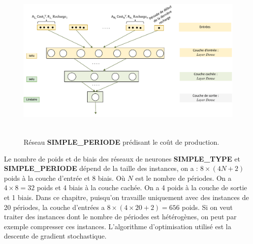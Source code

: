\begin{figure}[H]
	\centerline{
		\includegraphics[height=8cm]{images_these/SFC2.pdf}}
	\caption[Réseau SIMPLE\_PERIODE]{Réseau \textbf{SIMPLE\_PERIODE} prédisant le coût de production.}
	\label{SFC2}
\end{figure}

Le nombre de poids et de biais des réseaux de neurones \textbf{SIMPLE\_TYPE} et \textbf{SIMPLE\_PERIODE} dépend de la taille des instances, on a : $8 \times (4N+2)$ poids à la couche d'entrée et 8 biais. Où $N$ est le nombre de périodes. On a $4 \times 8 =32$ poids et 4 biais à la couche cachée. On a 4 poids à la couche de sortie et 1 biais. Dans ce chapitre, puisqu'on travaille uniquement avec des instances de 20 périodes, la couche d'entrées a $8\times(4\times 20 +2)=656$ poids. Si on veut traiter des instances dont le nombre de périodes est hétérogènes, on peut par exemple compresser ces instances.
L'algorithme d'optimisation utilisé est la descente de gradient stochastique. 


